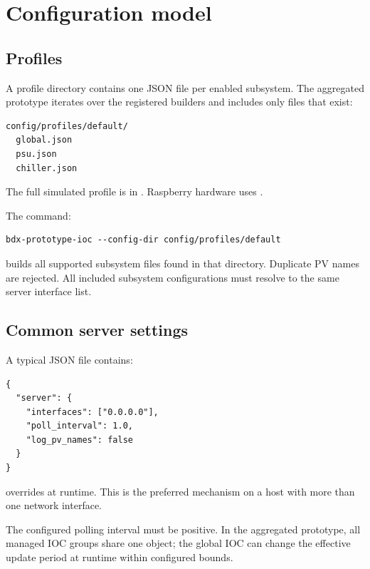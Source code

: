 \section{Configuration model}

\subsection{Profiles}

A profile directory contains one JSON file per enabled subsystem. The aggregated prototype iterates over the registered builders and includes only files that exist:

\begin{lstlisting}
config/profiles/default/
  global.json
  psu.json
  chiller.json
\end{lstlisting}

The full simulated profile is in . Raspberry hardware uses .

The command:

\begin{lstlisting}[style=shell]
bdx-prototype-ioc --config-dir config/profiles/default
\end{lstlisting}

builds all supported subsystem files found in that directory. Duplicate PV names are rejected. All included subsystem configurations must resolve to the same server interface list.

\subsection{Common server settings}

A typical JSON file contains:

\begin{lstlisting}[style=json]
{
  "server": {
    "interfaces": ["0.0.0.0"],
    "poll_interval": 1.0,
    "log_pv_names": false
  }
}
\end{lstlisting}

 overrides  at runtime. This is the preferred mechanism on a host with more than one network interface.

The configured polling interval must be positive. In the aggregated prototype, all managed IOC groups share one  object; the global IOC can change the effective update period at runtime within configured bounds.

